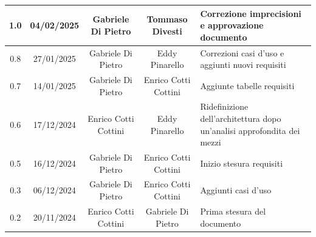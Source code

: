 \documentclass{article}
\begin{document}
\begin{table}[h]
\begin{tabular}{|c|c|c|c|m{}|}
        \hline
        1.0 & 04/02/2025 & Gabriele Di Pietro & Tommaso Divesti & Correzione imprecisioni e approvazione documento \\
        \hline
        0.8 & 27/01/2025 & Gabriele Di Pietro & Eddy Pinarello & Correzioni casi d'uso e aggiunti nuovi requisiti \\
        \hline
        0.7 & 14/01/2025 & Gabriele Di Pietro & Enrico Cotti Cottini & Aggiunte tabelle requisiti \\
        \hline
        0.6 & 17/12/2024 & Enrico Cotti Cottini & Eddy Pinarello & Ridefinizione dell'architettura dopo un'analisi approfondita dei mezzi \\
        \hline
        0.5 & 16/12/2024 & Gabriele Di Pietro & Enrico Cotti Cottini & Inizio stesura requisiti \\
        \hline
        0.3 & 06/12/2024 & Gabriele Di Pietro & Enrico Cotti Cottini & Aggiunti casi d'uso \\
        \hline
        0.2 & 20/11/2024 & Enrico Cotti Cottini & Gabriele Di Pietro & Prima stesura del documento \\
        \hline
    \end{tabular}
\end{table}


\newpage
\tableofcontents
\listoftables
\listoffigures

\newpage



\newpage



\newpage



\newpage


\end{document}
